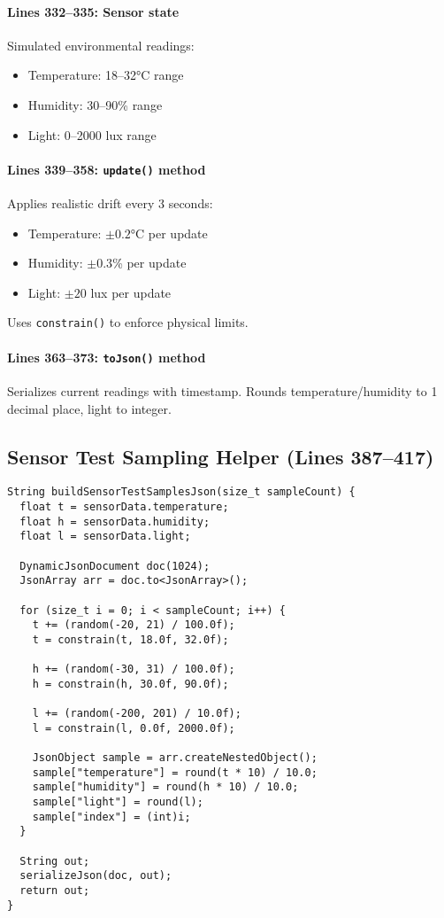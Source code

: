 \documentclass[11pt,a4paper]{article}
\begin{document}
\paragraph{Lines 332--335: Sensor state}
Simulated environmental readings:
\begin{itemize}[leftmargin=*]
  \item Temperature: 18--32°C range
  \item Humidity: 30--90\% range
  \item Light: 0--2000 lux range
\end{itemize}

\paragraph{Lines 339--358: \texttt{update()} method}
Applies realistic drift every 3 seconds:
\begin{itemize}[leftmargin=*]
  \item Temperature: $\pm0.2$°C per update
  \item Humidity: $\pm0.3$\% per update
  \item Light: $\pm20$ lux per update
\end{itemize}
Uses \texttt{constrain()} to enforce physical limits.

\paragraph{Lines 363--373: \texttt{toJson()} method}
Serializes current readings with timestamp. Rounds temperature/humidity to 1 decimal place, light to integer.

\subsection{Sensor Test Sampling Helper (Lines 387--417)}

\begin{verbatim}
String buildSensorTestSamplesJson(size_t sampleCount) {
  float t = sensorData.temperature;
  float h = sensorData.humidity;
  float l = sensorData.light;

  DynamicJsonDocument doc(1024);
  JsonArray arr = doc.to<JsonArray>();

  for (size_t i = 0; i < sampleCount; i++) {
    t += (random(-20, 21) / 100.0f);
    t = constrain(t, 18.0f, 32.0f);

    h += (random(-30, 31) / 100.0f);
    h = constrain(h, 30.0f, 90.0f);

    l += (random(-200, 201) / 10.0f);
    l = constrain(l, 0.0f, 2000.0f);

    JsonObject sample = arr.createNestedObject();
    sample["temperature"] = round(t * 10) / 10.0;
    sample["humidity"] = round(h * 10) / 10.0;
    sample["light"] = round(l);
    sample["index"] = (int)i;
  }

  String out;
  serializeJson(doc, out);
  return out;
}
\end{verbatim}
\end{document}
